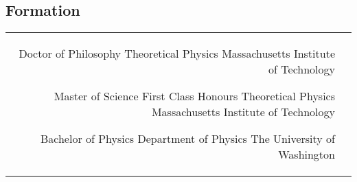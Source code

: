 \documentclass[10pt]{article} %
\begin{document}
\begin{paracol}{2}

  \section{Formation}





  \begin{supertabular}{rl} %


    {Doctor of Philosophy} %
    {} %
    {Theoretical Physics} %
    {Massachusetts Institute of Technology} %


    {Master of Science} %
    {First Class Honours} %
    {Theoretical Physics} %
    {Massachusetts Institute of Technology} %


    {Bachelor of Physics} %
    {} %
    {Department of Physics} %
    {The University of Washington} %


  \end{supertabular}



\end{paracol}
\end{document}
